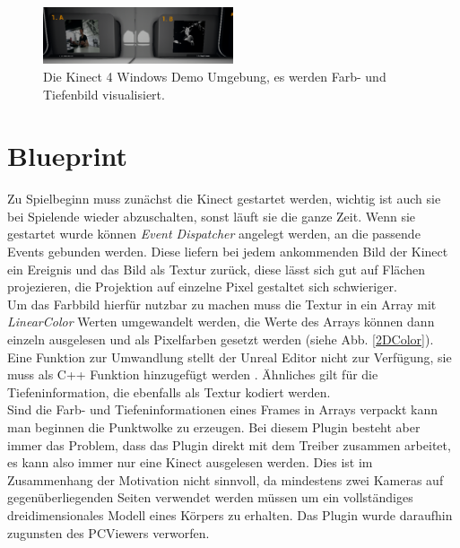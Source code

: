 \documentclass[a4paper]{IEEEtran}
\begin{document}
	\begin{figure}[!h]
    	\centering
		\includegraphics[width=0.5\textwidth]{img/Kinect4Windows}
	    \caption{Die Kinect 4 Windows Demo Umgebung, es werden Farb- und Tiefenbild visualisiert.}
    	\label{Kinect4Windows}
	\end{figure}

\section{Blueprint}
	Zu Spielbeginn muss zunächst die Kinect gestartet werden, wichtig ist auch sie bei Spielende wieder abzuschalten, sonst läuft sie die ganze Zeit. 
	Wenn sie gestartet wurde können {\textit{Event Dispatcher}} angelegt werden, an die passende Events gebunden werden. 
	Diese liefern bei jedem ankommenden Bild der Kinect ein Ereignis und das Bild als Textur zurück, diese lässt sich gut auf Flächen projezieren, die Projektion auf einzelne Pixel gestaltet sich schwieriger. \\
	Um das Farbbild hierfür nutzbar zu machen muss die Textur in ein Array mit {\textit{LinearColor}} Werten umgewandelt werden, die Werte des Arrays können dann einzeln ausgelesen und als Pixelfarben gesetzt werden (siehe Abb. \ref{2DColor}). 
	Eine Funktion zur Umwandlung stellt der Unreal Editor nicht zur Verfügung, sie muss als C++ Funktion hinzugefügt werden . Ähnliches gilt für die Tiefeninformation, die ebenfalls als Textur kodiert werden. \\
	Sind die Farb- und Tiefeninformationen eines Frames in Arrays verpackt kann man beginnen die Punktwolke zu erzeugen.
	Bei diesem Plugin besteht aber immer das Problem, dass das Plugin direkt mit dem Treiber zusammen arbeitet, es kann also immer nur eine Kinect ausgelesen werden. 
	Dies ist im Zusammenhang der Motivation nicht sinnvoll, da mindestens zwei Kameras auf gegenüberliegenden Seiten verwendet werden müssen um ein vollständiges dreidimensionales Modell eines Körpers zu erhalten.
	Das Plugin wurde daraufhin zugunsten des PCViewers verworfen.
\end{document}
